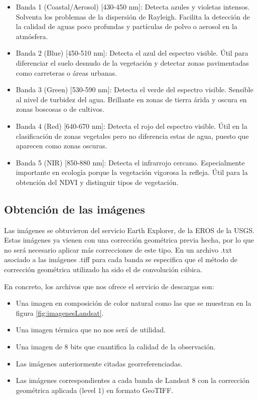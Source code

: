\begin{itemize}
	\item Banda 1 (Coastal/Aerosol) [430-450 nm]: Detecta azules y violetas intensos. Solventa los problemas de la dispersión de Rayleigh. Facilita la detección de la calidad de aguas poco profundas y partículas de polvo o aerosol en la atmósfera.
	\item Banda 2 (Blue) [450-510 nm]: Detecta el azul del espectro visible. Útil para diferenciar el suelo desnudo de la vegetación y detectar zonas pavimentadas como carreteras o áreas urbanas.
	\item Banda 3 (Green) [530-590 nm]: Detecta el verde del espectro visible. Sensible al nivel de turbidez del agua. Brillante en zonas de tierra árida y oscura en zonas boscosas o de cultivos.
	\item Banda 4 (Red) [640-670 nm]: Detecta el rojo del espectro visible. Útil en la clasificación de zonas vegetales pero no diferencia estas de agua, puesto que aparecen como zonas oscuras.
	\item Banda 5 (NIR) [850-880 nm]: Detecta el infrarrojo cercano. Especialmente importante en ecología porque la vegetación vigorosa la refleja. Útil para la obtención del \ac{NDVI} y distinguir tipos de vegetación.
\end{itemize}


\subsection{Obtención de las imágenes}
Las imágenes se obtuvieron del servicio Earth Explorer, de la \ac{EROS} de la \ac{USGS}. Estas imágenes ya vienen con una corrección geométrica previa hecha, por lo que no será necesario aplicar más correcciones de este tipo. En un archivo .txt asociado a las imágenes .tiff para cada banda se especifica que el método de corrección geométrica utilizado ha sido el de convolución cúbica.%

En concreto, los archivos que nos ofrece el servicio de descargas son:

\begin{itemize}
	\item Una imagen en composición de color natural como las que se muestran en la figura \ref{fig:imagenesLandsat}.
	\item Una imagen térmica que no nos será de utilidad.
	\item Una imagen de 8 bits que cuantifica la calidad de la observación.
	\item Las imágenes anteriormente citadas georreferenciadas.
	\item Las imágenes correspondientes a cada banda de Landsat 8 con la corrección geométrica aplicada (level 1) en formato GeoTIFF.
\end{itemize}%

